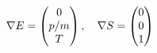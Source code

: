 \documentclass[preview]{standalone}
\begin{document}
\begin{align*}
\special{dvisvgm:raw <g id='unique000'>}\nabla E=\begin{pmatrix}0\\p/m\\T\end{pmatrix},\quad\nabla S=\begin{pmatrix}0\\0\\1\end{pmatrix}\special{dvisvgm:raw </g>}
\end{align*}
\end{document}
